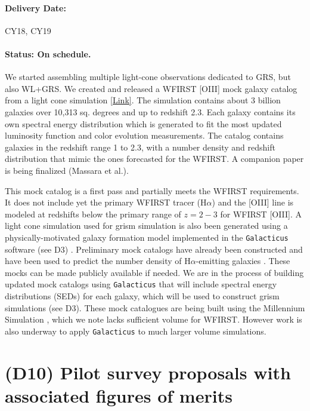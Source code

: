 \paragraph*{Delivery Date:} CY18, CY19

\paragraph*{Status: On schedule.} We started assembling multiple light-cone
observations dedicated to GRS, but also WL+GRS. We created and released a WFIRST
[OIII] mock galaxy catalog from a light cone simulation
\href{http://www.wfirst-hls-cosmology.org/products/}{[Link]}. The simulation
contains about 3 billion galaxies over 10,313 sq. degrees and up to redshift
2.3. Each galaxy contains its own spectral energy distribution which is
generated to fit the most updated luminosity function and color evolution
measurements. The catalog contains galaxies in the redshift range 1 to 2.3, with
a number density and redshift distribution that mimic the ones forecasted for
the WFIRST. A companion paper is being finalized (Massara et al.).

This mock catalog is a first pass and partially meets the WFIRST requirements.
It does not include yet the primary WFIRST tracer (H$\alpha$) and the [OIII] line
is modeled at redshifts below the primary range of $z=2-3$ for WFIRST [OIII]. A
light cone simulation used for grism simulation is also been generated using a
physically-motivated galaxy formation model implemented in the
\texttt{Galacticus} software (see D3) \citep{Benson2010}. Preliminary mock
catalogs have already been constructed and have been used to predict the number
density of H$\alpha$-emitting galaxies \citep{Merson2018}. These mocks can be
made publicly available if needed. We are in the process of building updated
mock catalogs using \texttt{Galacticus} that will include spectral energy
distributions (SEDs) for each galaxy, which will be used to construct grism
simulations (see D3). These mock catalogues are being built using the Millennium
Simulation \citep{Springel05}, which we note lacks sufficient volume for WFIRST.
However work is also underway to apply \texttt{Galacticus} to much larger volume
simulations.


\section*{(D10) Pilot survey proposals with associated figures of merits}

